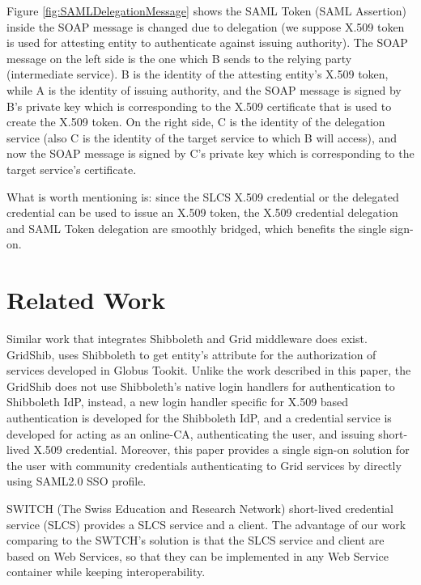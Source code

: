 Figure \ref{fig:SAMLDelegationMessage} shows the SAML Token (SAML Assertion) inside the SOAP message is changed due to delegation (we suppose X.509 token is used for attesting entity to authenticate against issuing authority). The SOAP message on the left side is the one which B sends to the relying party (intermediate service). B is the identity of the attesting entity’s X.509 token, while A is the identity of issuing authority, and the SOAP message is signed by B’s private key which is corresponding to the X.509 certificate that is used to create the X.509 token. On the right side, C is the identity of the delegation service (also C is the identity of the target service to which B will access), and now the SOAP message is signed by C’s private key which is corresponding to the target service’s certificate.

What is worth mentioning is: since the SLCS X.509 credential or the delegated credential can be used to issue an X.509 token,  the X.509 credential delegation and SAML Token delegation are smoothly bridged, which benefits the single sign-on.



\section{Related Work}
\label{sec:relatedwork}
Similar work that integrates Shibboleth and Grid middleware does exist. GridShib\cite{VWelch05},\cite{TBarton06} uses Shibboleth to get entity’s attribute for the authorization of services developed in Globus Tookit. Unlike the work described in this paper, the GridShib does not use Shibboleth’s native login handlers for authentication to Shibboleth IdP, instead, a new login handler specific for X.509 based authentication is developed for the Shibboleth IdP, and a credential service is developed for acting as an online-CA, authenticating the user, and issuing short-lived X.509 credential. Moreover, this paper provides a single sign-on solution for the user with community credentials authenticating to Grid services by directly using SAML2.0 SSO profile.

SWITCH (The Swiss Education and Research Network) short-lived credential service (SLCS)\cite{switchslcslink} provides a SLCS service and a client. The advantage of our work comparing to the SWTCH’s solution is that the SLCS service and client are based on Web Services, so that they can be implemented in any Web Service container while keeping interoperability.

